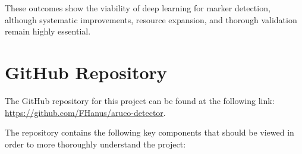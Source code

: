 \documentclass[conference]{IEEEtran}
\begin{document}
These outcomes show the viability of deep learning for marker detection, although systematic improvements, resource expansion,
and thorough validation remain highly essential.

\printbibsection

\appendices

\renewcommand{\thesection}{\Alph{section}}

\section{GitHub Repository}

The GitHub repository for this project can be found at the following link: \url{https://github.com/FHanus/aruco-detector}.

The repository contains the following key components that should be viewed in order to more thoroughly understand the project:
\end{document}
